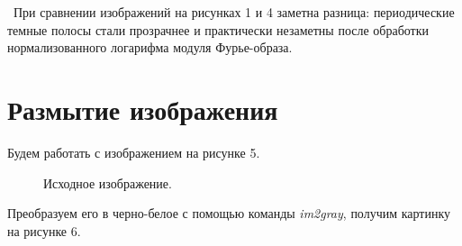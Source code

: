 \documentclass[a5paper, 10pt]{article}
\theoremstyle{definition}
\theoremstyle{plain}
\theoremstyle{remark}
\begin{document}
\newpage
\,
\newpage
При сравнении изображений на рисунках 1 и 4 заметна разница: периодические темные полосы стали прозрачнее и практически незаметны после обработки нормализованного логарифма модуля Фурье-образа.


\newpage
\section{Размытие изображения}
Будем работать с изображением на рисунке 5.

\begin{figure}[h!]
\caption{Исходное изображение. }
\end{figure}

\newpage
Преобразуем его в черно-белое с помощью команды \textit{im2gray}, получим картинку на рисунке 6.
\end{document}
